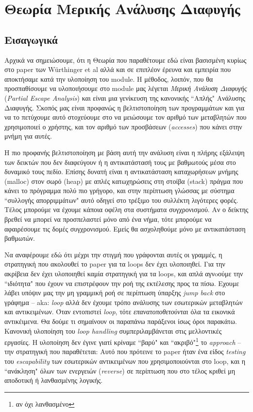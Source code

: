 \chapter{Θεωρία Μερικής Ανάλυσης Διαφυγής}
\label{chapter3b} 

\section{Εισαγωγικά}

Αρχικά να σημειώσουμε, ότι η Θεωρία που παραθέτουμε εδώ είναι βασισμένη κυρίως
στο paper των W{\"u}rthinger et al\cite{stadler2014partial} αλλά και σε επιπλέον
έρευνα και εμπειρία που αποκτήσαμε κατά την υλοποίηση του module. Η μέθοδος,
λοιπόν, που θα προσπαθίσουμε να υλοποιήσουμε στο module μας λέγεται
\textit{Μερική Ανάλυση Διαφυγής} (\textit{Partial Escape Analysis}) και είναι
μια γενίκευση της κανονικής ``Απλής" Ανάλυσης Διαφυγής. Σκοπός μας είναι προφανώς
η βελτιστοποίηση των προγραμμάτων και για να το πετύχουμε αυτό στοχεύουμε στο να
μειώσουμε τον αριθμό των μεταβλητών που χρησιμοποιεί ο χρήστης, και τον αριθμό
των προσβάσεων (\textit{accesses}) που κάνει στην μνήμη για αυτές.

Η πιο προφανής βελτιστοποίηση με βάση αυτή την ανάλυση είναι η πλήρης εξάλειψη
των δεικτών που δεν διαφεύγουν ή η αντικατάστασή τους με βαθμωτούς μέσα στο
δυναμικό τους πεδίο. Επίσης δυνατή είναι η αντικατάσταση καταχωρήσεων μνήμης
(malloc) στον σωρό (heap) με απλές κατωχηρώσεις στη στοίβα (stack) πράγμα που
κάνει το πρόγραμμα πολύ πιο γρήγορο, και στην περίπτωση γλώσσας με σύστημα
``συλλογής απορριμμάτων" αυτό οδηγεί στο τρέξιμο του συλλέκτη λιγότερες φορές.
Τέλος μπορούμε να έχουμε κάποια οφέλη στα συστήματα συγχρονισμού. Αν ο δείκτης
βρεθεί να μπορεί να προσπελαστεί μόνο από ένα νήμα, τότε μπορούμε να 
αφαιρέσουμε τις δομές συγχρονισμού. Εμείς θα ασχοληθούμε μόνο με αντικατάσταση 
βαθμωτών.

Να αναφέρουμε εδώ ότι μέχρι την στιγμή που γράφονται αυτές οι γραμμές, η
στρατηγική που ακολουθεί το paper για τα loops δεν έχει υλοποιηθεί. Για την
ακρίβεια δεν έχει υλοποιηθεί καμία στρατηγική για τα loops, και απλά αγνoούμε
την ``ιδιότητα" που έχουν να επιστρέφουν την ροή της εκτέλεσης προς τα πίσω.
Εχουμε λάβει υπόψιν μας την μη γραμμική ροή σε περίπτωση ύπαρξης \textit{jump
back} στο γράφημα – aka: \textit{loop} αλλά δεν έχουμε τρόπο ανάλυσης των
εσωτερικών μεταβλητών και αντικειμένων. Όταν εντοπιστεί \textit{loop}, τότε
\textit{επανατοποθετούνται} όλα τα εικονικά αντικέιμενα. Θα δούμε τι σημαίνουν
οι παραπάνω παράξενοι ίσως όροι παρακάτω. Κανονική υλοποίηση του \textit{loop
handling} συμπεριλαμβάνεται στις μελλοντικές εργασίες. Η υλοποίηση δεν έγινε
γιατί κρίναμε ``βαρύ" και ``ακριβό"\footnote{αν όχι λανθασμένο} το
\textit{approach} – την στρατηγική που παραθέτεται: Αυτό που πρότεινε το paper
ήταν ένα είδος \textit{testing} του \textit{escapability} των εσωτερικών
αντικειμένων που χρησιμοποιούνται στο loop, και η ``ανάκληση" όλων των ενεργειών
(\textit{reverse}) σε περίπτωση που στο τέλος κριθεί μη αποδοτική ή λανθασμένης
λογικής.

